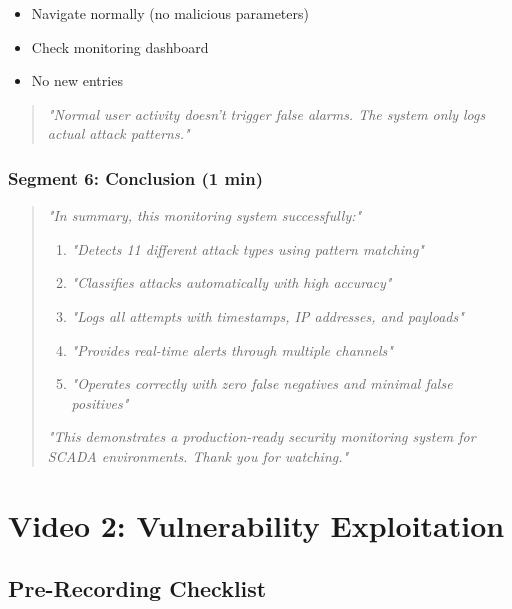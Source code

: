\documentclass[12pt,a4paper]{article}
\begin{document}
\begin{itemize}
    \item Navigate normally (no malicious parameters)
    \item Check monitoring dashboard
    \item No new entries
\end{itemize}

\begin{quote}
\textit{"Normal user activity doesn't trigger false alarms. The system only logs actual attack patterns."}
\end{quote}

\subsubsection{Segment 6: Conclusion (1 min)}

\begin{quote}
\textit{"In summary, this monitoring system successfully:"}
\begin{enumerate}
    \item \textit{"Detects 11 different attack types using pattern matching"}
    \item \textit{"Classifies attacks automatically with high accuracy"}
    \item \textit{"Logs all attempts with timestamps, IP addresses, and payloads"}
    \item \textit{"Provides real-time alerts through multiple channels"}
    \item \textit{"Operates correctly with zero false negatives and minimal false positives"}
\end{enumerate}

\textit{"This demonstrates a production-ready security monitoring system for SCADA environments. Thank you for watching."}
\end{quote}

\newpage
\section{Video 2: Vulnerability Exploitation}

\subsection{Pre-Recording Checklist}
\end{document}
